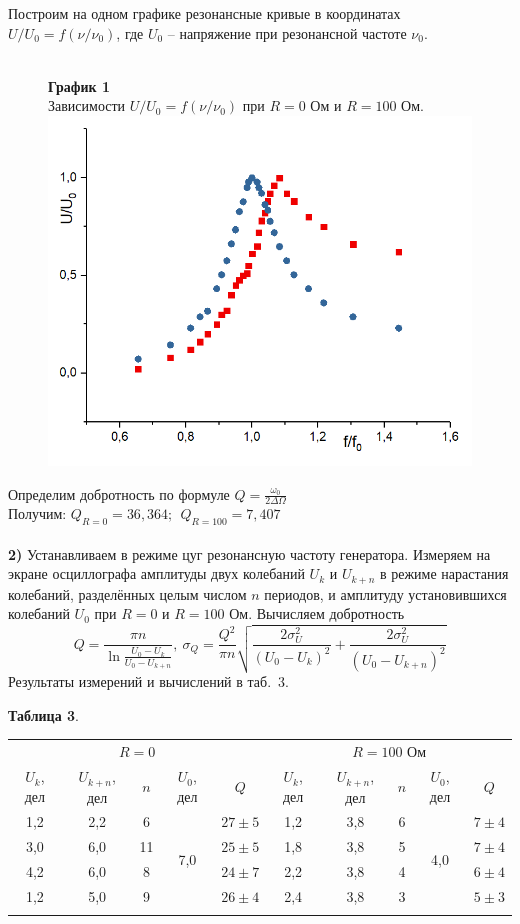 \documentclass[11pt,a4paper]{article}
\begin{document}
Построим на одном графике резонансные кривые в координатах $U/U_0 = f(\nu/\nu_0)$, где $U_0$ -- напряжение при резонансной частоте $\nu_0$.
\\\\
\begin{figure} [h!]
	\centering
	\textbf{График 1}\\
	Зависимости $U/U_0 = f(\nu/\nu_0)$ при $R=0$ Ом и $R=100$ Ом.
	\\
	\includegraphics[width=0.55\linewidth]{1}
\end{figure}
Определим добротность по формуле $Q = \frac{\omega_0}{2\Delta\Omega}$ 
\\
Получим: $\boxed {Q_{R=0} = 36,364; \ \  Q_{R=100} = 7,407}$ \\\\
\textbf{2)} Устанавливаем в режиме цуг резонансную частоту генератора. Измеряем на экране осциллографа амплитуды двух колебаний $U_k$ и $U_{k+n}$ в режиме нарастания колебаний, разделённых целым числом $n$ периодов, и амплитуду установившихся колебаний $U_0$ при $R=0$ и $R=100$ Ом. Вычисляем добротность
$$
Q=\frac{\pi n}{\ln\frac{U_0-U_k}{U_0-U_{k+n}}},\ 
\sigma_Q=\frac{Q^2}{\pi n}\sqrt{\frac{2\sigma_U^2}{(U_0-U_k)^2}+\frac{2\sigma_U^2}{(U_0-U_{k+n})^2}}
$$
Результаты измерений и вычислений в таб.~3.
\begin{table}[h!]
	\begin{center}
			\textbf{Таблица 3}.\\
		\begin{tabular}{|c|c|c|c|c||c|c|c|c|c|}
			\hline\multicolumn{5}{|c||}{$R=0$}&\multicolumn{5}{c|}{$R=100$ Ом}\\
			\hhline{|-|-|-|-|-||-|-|-|-|-|}
			$U_k$, дел&$U_{k+n}$, дел&$n$&$U_0$, дел&$Q$&
			$U_k$, дел&$U_{k+n}$, дел&$n$&$U_0$, дел&$Q$\\
			\hhline{|-|-|-|-|-||-|-|-|-|-|}
			1,2&2,2&6&\multirow{4}{*}{7,0}&$27\pm5$
			&1,2&3,8&6&\multirow{4}{*}{4,0}&$7\pm4$
			\\
			\hhline{|-|-|-|~|-||-|-|-|~|-|}
			3,0&6,0&11&&$25\pm5$&1,8&3,8&5&&$7\pm4$\\
			\hhline{|-|-|-|~|-||-|-|-|~|-|}
			4,2&6,0&8&&$24\pm7$&2,2&3,8&4&&$6\pm4$\\
			\hhline{|-|-|-|~|-||-|-|-|~|-|}
			1,2&5,0&9&&$26\pm4$&2,4&3,8&3&&$5\pm3$\\
			\hline
			\multicolumn{10}{c}{\strut}\\
		\end{tabular}
	\end{center}
\end{table}\\
\end{document}

